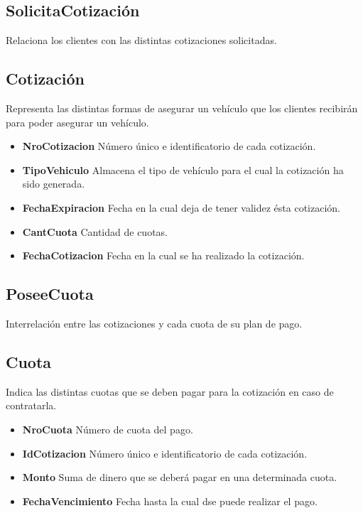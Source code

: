 \documentclass[a4paper,11pt]{article}
\begin{document}
\subsection{SolicitaCotización}

Relaciona los clientes con las distintas cotizaciones solicitadas.

\subsection{Cotización}

Representa las distintas formas de asegurar un vehículo que los clientes recibirán para poder asegurar
un vehículo.

\begin{itemize}

  \item \textbf{NroCotizacion} Número único e identificatorio de cada cotización.
  
  \item \textbf{TipoVehiculo} Almacena el tipo de vehículo para el cual la cotización ha sido generada.

  \item \textbf{FechaExpiracion} Fecha en la cual deja de tener validez ésta cotización.
  
  \item \textbf{CantCuota} Cantidad de cuotas.

  \item \textbf{FechaCotizacion} Fecha en la cual se ha realizado la cotización.
      
\end{itemize}

\subsection{PoseeCuota}

Interrelación entre las cotizaciones y cada cuota de su plan de pago.

\subsection{Cuota}

Indica las distintas cuotas que se deben pagar para la cotización en caso de contratarla.

\begin{itemize}

  \item \textbf{NroCuota} Número de cuota del pago.
    
  \item \textbf{IdCotizacion} Número único e identificatorio de cada cotización.
  
  \item \textbf{Monto} Suma de dinero que se deberá pagar en una determinada cuota.

  \item \textbf{FechaVencimiento} Fecha hasta la cual dse puede realizar el pago.

\end{itemize}
\end{document}

